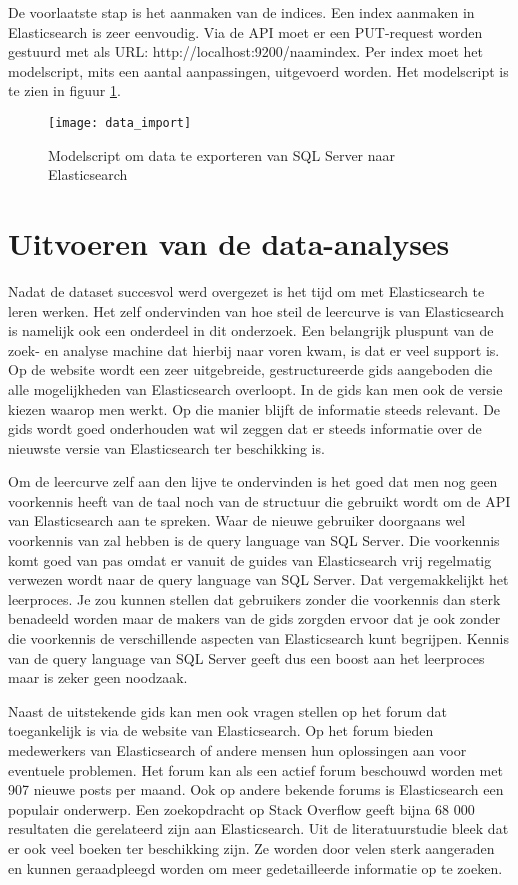 De voorlaatste stap is het aanmaken van de indices. Een index aanmaken in Elasticsearch is zeer eenvoudig. Via de API moet er een PUT-request worden gestuurd met als URL: http://localhost:9200/naam\textunderscore index.
Per index moet het modelscript, mits een aantal aanpassingen, uitgevoerd worden. Het modelscript is te zien in figuur \ref{fig:data_import}.

\begin{figure}
	\centering
	\texttt{[image: data\_import]}
	\caption{Modelscript om data te exporteren van SQL Server naar Elasticsearch}
	\label{fig:data_import}
\end{figure}

\section{Uitvoeren van de data-analyses}
Nadat de dataset succesvol werd overgezet is het tijd om met Elasticsearch te leren werken. Het zelf ondervinden van hoe steil de leercurve is van Elasticsearch is namelijk ook een onderdeel in dit onderzoek. Een belangrijk pluspunt van de zoek- en analyse machine dat hierbij naar voren kwam, is dat er veel support is. Op de website wordt een zeer uitgebreide, gestructureerde gids aangeboden die alle mogelijkheden van Elasticsearch overloopt. In de gids kan men ook de versie kiezen waarop men werkt. Op die manier blijft de informatie steeds relevant. De gids wordt goed onderhouden wat wil zeggen dat er steeds informatie over de nieuwste versie van Elasticsearch ter beschikking is. 

Om de leercurve zelf aan den lijve te ondervinden is het goed dat men nog geen voorkennis heeft van de taal noch van de structuur die gebruikt wordt om de API van Elasticsearch aan te spreken. Waar de nieuwe gebruiker doorgaans wel voorkennis van zal hebben is de query language van SQL Server. Die voorkennis komt goed van pas omdat er vanuit de guides van Elasticsearch vrij regelmatig verwezen wordt naar de query language van SQL Server. Dat vergemakkelijkt het leerproces. Je zou kunnen stellen dat gebruikers zonder die voorkennis dan sterk benadeeld worden maar de makers van de gids zorgden ervoor dat je ook zonder die voorkennis de verschillende aspecten van Elasticsearch kunt begrijpen. Kennis van de query language van SQL Server geeft dus een boost aan het leerproces maar is zeker geen noodzaak.

Naast de uitstekende gids kan men ook vragen stellen op het forum dat toegankelijk is via de website van Elasticsearch. Op het forum bieden medewerkers van Elasticsearch of andere mensen hun oplossingen aan voor eventuele problemen. Het forum kan als een actief forum beschouwd worden met 907 nieuwe posts per maand. Ook op andere bekende forums is Elasticsearch een populair onderwerp. Een zoekopdracht op Stack Overflow geeft bijna 68 000 resultaten die gerelateerd zijn aan Elasticsearch. Uit de literatuurstudie bleek dat er ook veel boeken ter beschikking zijn. Ze worden door velen sterk aangeraden en kunnen geraadpleegd worden om meer gedetailleerde informatie op te zoeken. 

